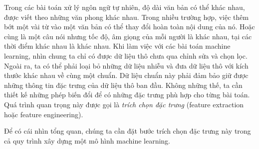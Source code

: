 Trong các bài toán xử lý ngôn ngữ tự nhiên, độ dài văn bản có thể khác nhau, được viết theo những văn phong khác nhau. Trong nhiều trường hợp, việc thêm bớt một vài từ vào một văn bản có thể thay đổi hoàn toàn nội dung của nó. Hoặc
cùng là một câu nói nhưng tốc độ, âm giọng của mỗi người là khác nhau, tại
các thời điểm khác nhau là khác nhau. 
Khi làm việc với các bài toán machine learning, nhìn chung ta chỉ có được dữ
liệu thô chưa qua chỉnh sửa và chọn lọc. Ngoài ra, ta có thể phải loại bỏ những
dữ liệu nhiễu và đưa dữ liệu thô với kích thước khác nhau về cùng một chuẩn. Dữ
liệu chuẩn này phải đảm bảo giữ được những thông tin đặc trưng của dữ liệu
thô ban đầu. Không những thế, ta cần thiết kế những phép
biến đổi để có những đặc trưng phù hợp cho từng bài toán. Quá trình quan trọng này được gọi là \textit{trích chọn đặc trưng} ({feature extraction} hoặc {feature engineering}).

 

Để có cái nhìn tổng quan, chúng ta cần đặt bước trích chọn đặc trưng này trong cả quy trình xây dựng một mô hình machine learning.
 
 
